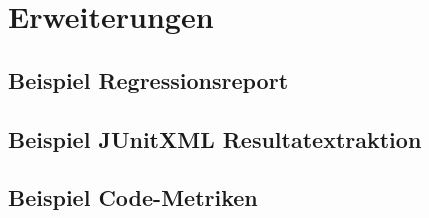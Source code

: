 \chapter{Erweiterungen}
\section{Beispiel Regressionsreport}
\section{Beispiel JUnitXML Resultatextraktion}
\section{Beispiel Code-Metriken}
